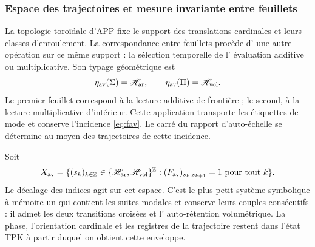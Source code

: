 \subsubsection{Espace des trajectoires et mesure invariante entre feuillets}
\label{sec:medida-retorno-hojas}

La topologie toroïdale d'APP fixe le support des translations cardinales
et leurs classes d'enroulement. La correspondance entre feuillets procède d'
une autre opération sur ce même support : la sélection temporelle de l'
évaluation additive ou multiplicative. Son typage géométrique est
\[
 \eta_{\rm av}(\Sigma)=\mathscr H_{\rm ar},\qquad
 \eta_{\rm av}(\Pi)=\mathscr H_{\rm vol}.
\]
Le premier feuillet correspond à la lecture additive de frontière ; le second,
à la lecture multiplicative d'intérieur. Cette application transporte les étiquettes
de mode et conserve l'incidence \eqref{eq:fav}. Le carré du rapport
d'auto-échelle se détermine au moyen des trajectoires de cette incidence.

\begin{definition}
Soit
\[
 X_{\rm av}=\{(s_k)_{k\in\mathbb Z}\in
 \{\mathscr H_{\rm ar},\mathscr H_{\rm vol}\}^{\mathbb Z}:
 (F_{\rm av})_{s_k,s_{k+1}}=1\text{ pour tout }k\}.
\]
Le décalage des indices agit sur cet espace. C'est le plus petit système
symbolique à mémoire un qui contient les suites modales et conserve
leurs couples consécutifs : il admet les deux transitions croisées et l'
auto-rétention volumétrique. La phase, l'orientation cardinale et les registres
de la trajectoire restent dans l'état TPK à partir duquel on obtient cette
enveloppe.
\end{definition}

